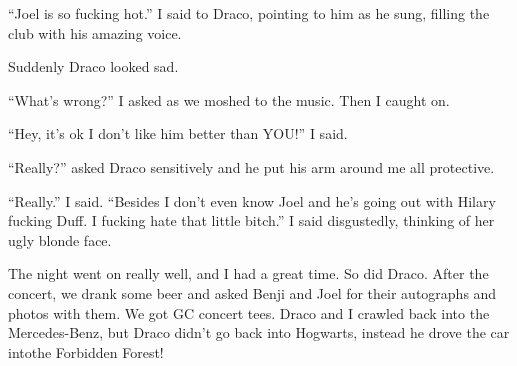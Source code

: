 \enquote{Joel is so fucking hot.} I said to Draco, pointing to him as he sung, filling the club with his amazing voice.

Suddenly Draco looked sad.

\enquote{What's wrong?} I asked as we moshed to the music. Then I caught on.

\enquote{Hey, it's ok I don't like him better than YOU!} I said.

\enquote{Really?} asked Draco sensitively and he put his arm around me all protective.

\enquote{Really.} I said. \enquote{Besides I don't even know Joel and he's going out with Hilary fucking Duff. I fucking hate that little bitch.} I said disgustedly, thinking of her ugly blonde face.

The night went on really well, and I had a great time. So did Draco. After the concert, we drank some beer and asked Benji and Joel for their autographs and photos with them. We got GC concert tees. Draco and I crawled back into the Mercedes-Benz, but Draco didn't go back into Hogwarts, instead he drove the car into\dotfill the Forbidden Forest!
